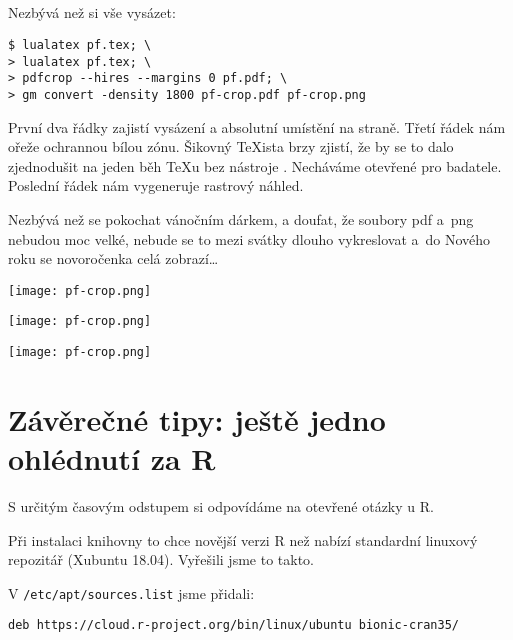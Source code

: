 \newpage
\begin{lstlisting}



\end{lstlisting}

Nezbývá než si vše vysázet:
\begin{lstlisting}
$ lualatex pf.tex; \
> lualatex pf.tex; \
> pdfcrop --hires --margins 0 pf.pdf; \
> gm convert -density 1800 pf-crop.pdf pf-crop.png
\end{lstlisting}

První dva řádky zajistí vysázení a absolutní umístění na straně. Třetí řádek nám ořeže ochrannou bílou zónu. Šikovný \TeX ista brzy zjistí, že by se to dalo zjednodušit na jeden běh \TeX u bez nástroje . Necháváme otevřené pro badatele. Poslední řádek nám vygeneruje rastrový náhled. 

Nezbývá než se pokochat vánočním dárkem, a doufat, že soubory pdf a~png nebudou moc velké, nebude se to mezi svátky dlouho vykreslovat a~do Nového roku se novoročenka celá zobrazí\ldots{}

\enlargethispage{\baselineskip}

\vfil

\noindent
\hfil
\texttt{[image: pf-crop.png]}%

\ifx\relax
\noindent
\hfill
\texttt{[image: pf-crop.png]}%
\par
\noindent
\texttt{[image: pf-crop.png]}%
\fi

\newpage
\section{Závěrečné tipy: ještě jedno ohlédnutí za R}
S určitým časovým odstupem si odpovídáme na otevřené otázky u R.

Při instalaci knihovny \balicek{rgdal} to chce novější verzi R než nabízí standardní linuxový repozitář (Xubuntu 18.04). Vyřešili jsme to takto. 

V \texttt{/etc/apt/sources.list} jsme přidali:
\begin{lstlisting}
deb https://cloud.r-project.org/bin/linux/ubuntu bionic-cran35/
\end{lstlisting}


